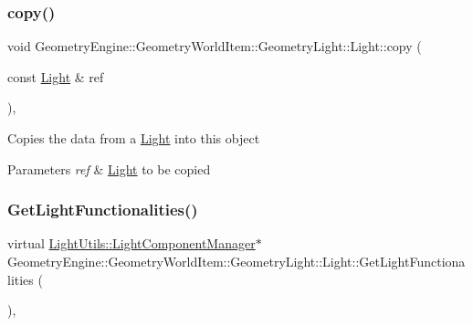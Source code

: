\subsubsection{\texorpdfstring{copy()}{copy()}}
{\footnotesize\ttfamily void Geometry\+Engine\+::\+Geometry\+World\+Item\+::\+Geometry\+Light\+::\+Light\+::copy (\begin{DoxyParamCaption}\item[{const \mbox{\hyperlink{class_geometry_engine_1_1_geometry_world_item_1_1_geometry_light_1_1_light}{Light}} \&}]{ref }\end{DoxyParamCaption})\hspace{0.3cm}{\ttfamily [protected]}, {\ttfamily [virtual]}}

Copies the data from a \mbox{\hyperlink{class_geometry_engine_1_1_geometry_world_item_1_1_geometry_light_1_1_light}{Light}} into this object 
\begin{DoxyParams}{Parameters}
{\em ref} & \mbox{\hyperlink{class_geometry_engine_1_1_geometry_world_item_1_1_geometry_light_1_1_light}{Light}} to be copied \\
\hline
\end{DoxyParams}
\mbox{\label{class_geometry_engine_1_1_geometry_world_item_1_1_geometry_light_1_1_light_a019f1a8457a883454d9c9d4272f7a1d5}} 
\subsubsection{\texorpdfstring{GetLightFunctionalities()}{GetLightFunctionalities()}}
{\footnotesize\ttfamily virtual \mbox{\hyperlink{class_geometry_engine_1_1_light_utils_1_1_light_component_manager}{Light\+Utils\+::\+Light\+Component\+Manager}}$\ast$ Geometry\+Engine\+::\+Geometry\+World\+Item\+::\+Geometry\+Light\+::\+Light\+::\+Get\+Light\+Functionalities (\begin{DoxyParamCaption}{ }\end{DoxyParamCaption})\hspace{0.3cm}{\ttfamily [inline]}, {\ttfamily [virtual]}}

